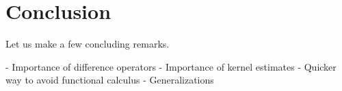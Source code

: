 \chapter{Conclusion}

Let us make a few concluding remarks.

- Importance of difference operators
- Importance of kernel estimates
- Quicker way to avoid functional calculus
- Generalizations
